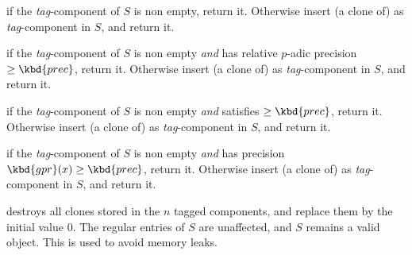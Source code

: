  if the
\emph{tag}-component of $S$ is non empty, return it. Otherwise insert
(a clone of)  as \emph{tag}-component in $S$, and return it.

if the \emph{tag}-component of $S$ is non empty \emph{and} has relative
$p$-adic precision $\geq \kbd{prec}$, return it. Otherwise insert (a clone
of)  as \emph{tag}-component in $S$, and return it.

 if the \emph{tag}-component of $S$ is non empty \emph{and}
satisfies  $\geq \kbd{prec}$, return it. Otherwise insert (a
clone of)  as \emph{tag}-component in $S$, and return it.

 if the \emph{tag}-component of $S$ is non empty
\emph{and} has precision $\kbd{gpr}(x)\geq \kbd{prec}$, return it. Otherwise
insert (a clone of)  as \emph{tag}-component in $S$,
and return it.

 destroys all clones stored in the $n$ tagged
components, and replace them by the initial value $0$. The regular entries of
$S$ are unaffected, and $S$ remains a valid object. This is used to
avoid memory leaks.
